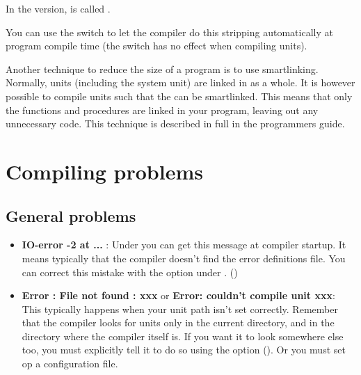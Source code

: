 \documentclass{report}
\begin{document}
\begin{remark}
In the \win version,  is called .
\end{remark}
You can use the  switch to let the compiler do this stripping
automatically at program compile time (the switch has no effect when
compiling units).

Another technique to reduce the size of a program is to use smartlinking.
Normally, units (including the system unit) are linked in as a whole.
It is however possible to compile units such that the can be smartlinked.
This means that only the functions and procedures are linked in your
program, leaving out any unnecessary code. This technique is described in
full in the programmers guide.

\chapter{Compiling problems}

\section{General problems}
\begin{itemize}
\item \textbf{IO-error -2 at ...} : Under \linux you can get this message at
compiler startup. It means typically that the compiler doesn't find the
error definitions file. You can correct this mistake with the 
option under \linux. ()
\item \textbf {Error : File not found : xxx} or \textbf{Error: couldn't compile
unit xxx}: This typically happens when
your unit path isn't set correctly. Remember that the compiler looks for
units only in the current directory, and in the directory where the compiler
itself is. If you want it to look somewhere else too, you must explicitly
tell it to do so using the  option (). Or you must set op
a configuration file.
\end{itemize}

\end{document}
